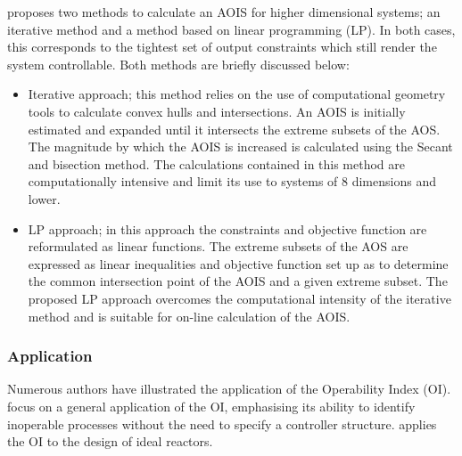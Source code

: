 \citet{limaphd} proposes two methods to calculate an AOIS for higher dimensional systems; an iterative method and a method based on linear programming (LP). 
In both cases, this corresponds to the tightest set of output constraints which still render the system controllable. 
Both methods are briefly discussed below:
\begin{itemize}
  \item Iterative approach; this method relies on the use of computational geometry tools to calculate convex hulls and intersections. 
An AOIS is initially estimated and expanded until it intersects the extreme subsets of the AOS. 
The magnitude by which the AOIS is increased is calculated using the Secant and bisection method. 
The calculations contained in this method are computationally intensive and limit its use to systems of 8 dimensions and lower.
  \item LP approach; in this approach the constraints and objective function are reformulated as linear functions. 
The extreme subsets of the AOS are expressed as linear inequalities and objective function set up as to determine the common intersection point of the AOIS and a given extreme subset. 
The proposed LP approach overcomes the computational intensity of the iterative method and is suitable for on-line calculation of the AOIS.
\end{itemize}

\subsubsection{Application}
Numerous authors have illustrated the application of the Operability Index (OI). 
\citet{opconproc} focus on a general application of the OI, emphasising its ability to identify inoperable processes without the need to specify a controller structure. 
\citet{opidealrx} applies the OI to the design of ideal reactors. 

